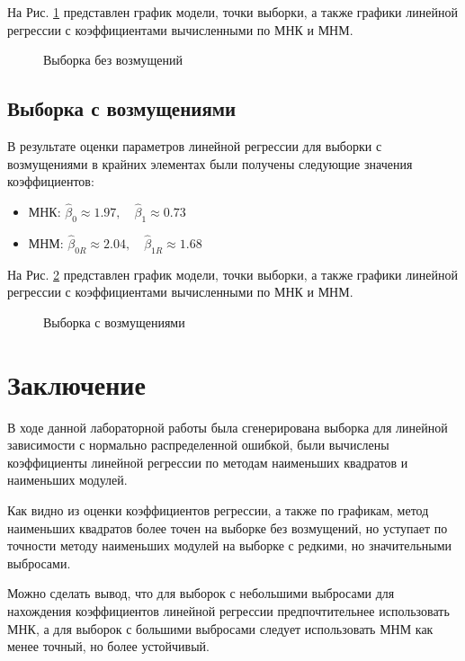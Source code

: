 \documentclass[12pt]{article}
\begin{document}
	На Рис. \ref{reg1} представлен график модели, точки выборки, а также графики линейной регрессии с коэффициентами вычисленными по МНК и МНМ.

	\begin{figure}[h]
		\caption{Выборка без возмущений}
		\label{reg1}
	\end{figure}

	\newpage

	\subsection{Выборка с возмущениями}

	В результате оценки параметров линейной регрессии для выборки с возмущениями в крайних элементах были получены следующие значения коэффициентов:

	\begin{itemize}
		\item МНК: $\hat{\beta}_0 \approx 1.97, \quad \hat{\beta}_1 \approx 0.73$
		\item МНМ: $\hat{\beta}_{0R} \approx 2.04, \quad \hat{\beta}_{1R} \approx 1.68$
	\end{itemize}

	На Рис. \ref{reg2} представлен график модели, точки выборки, а также графики линейной регрессии с коэффициентами вычисленными по МНК и МНМ.

	\begin{figure}[h]
		\caption{Выборка с возмущениями}
		\label{reg2}
	\end{figure}

\newpage
 \section*{Заключение}
{}
\par В ходе данной лабораторной работы была сгенерирована выборка для линейной зависимости с нормально распределенной ошибкой, были вычислены коэффициенты линейной регрессии по методам наименьших квадратов и наименьших модулей.
\par  Как видно из оценки коэффициентов регрессии, а также по графикам, метод наименьших квадратов более точен на выборке без возмущений, но уступает по точности методу наименьших модулей на выборке с редкими, но значительными выбросами.

Можно сделать вывод, что для выборок с небольшими выбросами для нахождения коэффициентов линейной регрессии предпочтительнее использовать МНК, а для выборок с большими выбросами следует использовать МНМ как менее точный, но более устойчивый.
\end{document}
